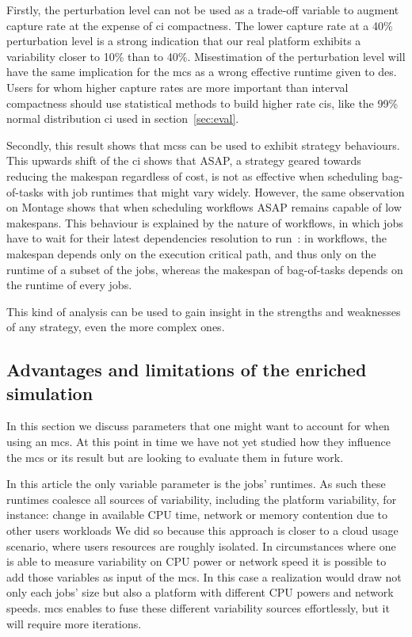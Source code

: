 \documentclass[10pt,conference,compsocconf]{IEEEtran}
\begin{document}
Firstly, the perturbation level can
not be used as a trade-off variable to augment capture rate at the expense of
\ac{ci} compactness. The lower capture rate at a 40\% perturbation level is a
strong indication that our real platform exhibits a variability closer to
10\% than to 40\%. Misestimation of the perturbation level will have the same
implication for the \ac{mcs} as a wrong effective runtime given to \ac{des}. 
Users for whom higher capture rates are more important than
interval compactness should use statistical methods to build higher rate \acp{ci},
like the 99\% normal distribution \ac{ci} used in section~\ref{sec:eval}.

Secondly, this result shows that \ac{mcs}s can be used to exhibit strategy
behaviours. This upwards shift of the \ac{ci} shows that ASAP, a strategy
geared towards reducing the makespan regardless of cost, is not as effective
when scheduling bag-of-tasks with job runtimes that might vary
widely. However, the same observation on Montage shows that when
scheduling workflows ASAP remains capable of low makespans. 
This behaviour is explained by the nature of workflows,
in which jobs have to wait for their latest dependencies resolution to run~: 
in workflows, the makespan depends only on the execution critical path, and thus
only on the runtime of a subset of the jobs, whereas the makespan of bag-of-tasks 
depends on the runtime of every jobs.

This kind of analysis can be used to gain insight in the strengths and
weaknesses of any strategy, even the more complex ones.


\subsection{Advantages and limitations of the enriched simulation}\label{sec:lim}

In this section we discuss parameters that one might want to account for when
using an \ac{mcs}. At this point in time we have not yet studied how they
influence the \ac{mcs} or its result but are looking to evaluate them in
future work.

In this article the only variable parameter is the jobs' runtimes. As such these
runtimes coalesce all sources of variability, including the platform variability,
for instance: change in available CPU time, network or memory contention due to other users workloads
We did so because this approach is closer to a cloud usage scenario, where users
resources are roughly isolated.
In circumstances where one is able to measure variability
on CPU power or network speed it is possible to add those variables as input of
the \ac{mcs}. In this case a realization would draw not only each jobs' size 
 but also a platform with different CPU powers and network speeds.
\ac{mcs} enables to fuse these different variability sources effortlessly, but it will
require more iterations. 
\end{document}
